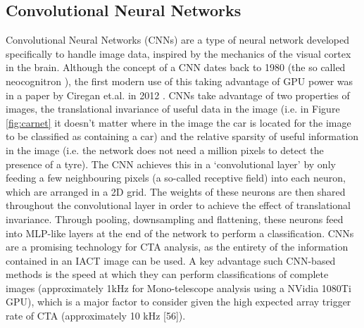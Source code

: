 \subsection{Convolutional Neural Networks}
Convolutional Neural Networks (CNNs) are a type of neural network developed specifically to handle image data, inspired by the mechanics of the visual cortex in the brain. Although the concept of a CNN dates back to 1980 (the so called neocognitron \cite{neocongnitron}), the first modern use of this taking advantage of GPU power was in a paper by Ciregan et.al. in 2012 \cite{ciregan}. CNNs take advantage of two properties of images, the translational invariance of useful data in the image (i.e. in Figure \ref{fig:carnet} it doesn't matter where in the image the car is located for the image to be classified as containing a car) and the relative sparsity of useful information in the image (i.e. the network does not need a million pixels to detect the presence of a tyre). The CNN achieves this in a `convolutional layer' by only feeding a few neighbouring pixels (a so-called receptive field) into each neuron, which are arranged in a 2D grid. The weights of these neurons are then shared throughout the convolutional layer in order to achieve the effect of translational invariance. Through pooling, downsampling and flattening, 
these neurons feed into MLP-like layers at the end of the network to perform a classification. CNNs are a promising technology for CTA analysis, as the entirety of the information contained in an IACT image can be used.  A key advantage such CNN-based methods is the speed at which they can perform classifications of complete images (approximately 1kHz for Mono-telescope analysis using a NVidia 1080Ti GPU), which is a major factor to consider given the high expected array trigger rate of CTA (approximately 10 kHz [56]).

